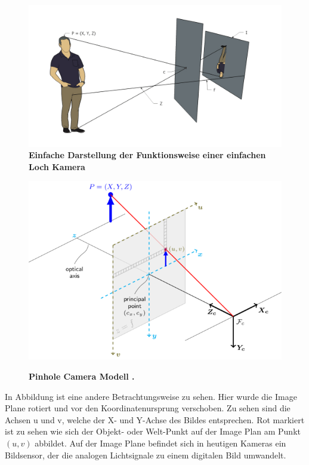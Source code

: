 \begin{figure}
\includegraphics[width=\textwidth]{media/simple-pinhole.png}\\
\caption{\textbf{Einfache Darstellung der Funktionsweise einer einfachen Loch Kamera}
}
\label{Fig:simple-pinhole}
\includegraphics[width=\textwidth]{media/pinhole_camera_model}\\
\caption{\textbf{Pinhole Camera Modell \autocite{OpencvCamera2016}.}
}
\label{Fig:pinhole}
\end{figure}

In Abbildung  ist eine andere Betrachtungsweise zu sehen. Hier wurde die Image Plane rotiert und vor den Koordinatenursprung verschoben. Zu sehen sind die Achsen u und v, welche der X- und Y-Achse des Bildes entsprechen. Rot markiert ist zu sehen wie sich der Objekt- oder Welt-Punkt auf der Image Plan am Punkt $(u, v)$ abbildet. Auf der Image Plane befindet sich in heutigen Kameras ein Bildsensor, der die analogen Lichtsignale zu einem digitalen Bild umwandelt. 

